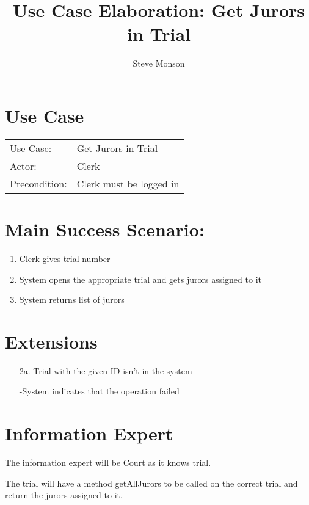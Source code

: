 \documentclass{article}
\title{Use Case Elaboration: Get Jurors in Trial}
\author{Steve Monson}
\begin{document}
\maketitle

\section*{Use Case}
\begin{tabular}{l l}
  Use Case:     & Get Jurors in Trial\\
  Actor:        & Clerk\\
  Precondition: & Clerk must be logged in\\
\end{tabular}

\section*{Main Success Scenario:}
\begin{enumerate}
  \item Clerk gives trial number
  \item System opens the appropriate trial and gets jurors assigned to it
  \item System returns list of jurors
\end{enumerate}

\section*{Extensions}
\begin{itemize}
    \item [2a.] Trial with the given ID isn't in the system

    -System indicates that the operation failed
\end{itemize}

\section*{Information Expert}

The information expert will be Court as it knows trial.

The trial will have a method getAllJurors to be called on the correct trial and return the jurors assigned to it. 
\end{document}

